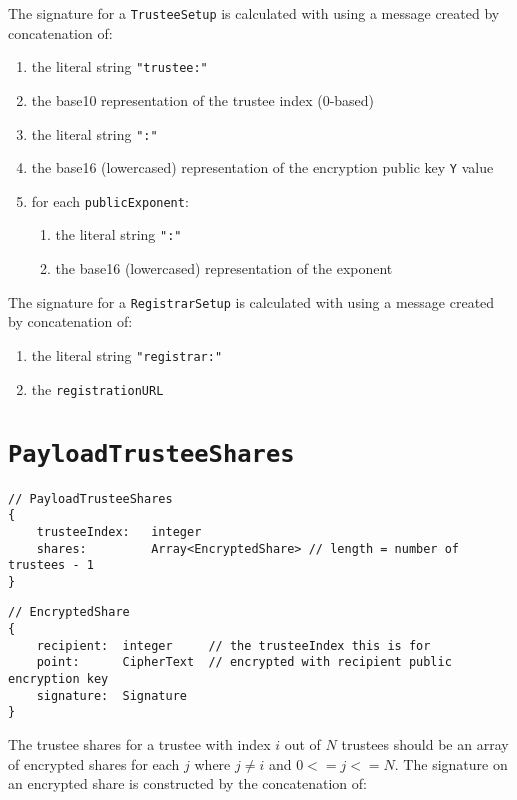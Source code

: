 The signature for a \texttt{TrusteeSetup} is calculated with using a message created by concatenation of:
\begin{enumerate}
  \item the literal string \lstinline[style=ES6]{"trustee:"}
  \item the base10 representation of the trustee index (0-based)
  \item the literal string \lstinline[style=ES6]{":"}
  \item the base16 (lowercased) representation of the encryption public key \texttt{Y} value
  \item for each \texttt{publicExponent}:
        \begin{enumerate}
          \item the literal string \lstinline[style=ES6]{":"}
          \item the base16 (lowercased) representation of the exponent
        \end{enumerate}
\end{enumerate}

The signature for a \texttt{RegistrarSetup} is calculated with using a message created by concatenation of:

\begin{enumerate}
  \item the literal string \lstinline[style=ES6]{"registrar:"}
  \item the \texttt{registrationURL}
\end{enumerate}


\section*{\texttt{PayloadTrusteeShares}}
\label{dt:payload:shares}
\begin{lstlisting}[style=ES6]
// PayloadTrusteeShares
{
    trusteeIndex:   integer
    shares:         Array<EncryptedShare> // length = number of trustees - 1
}
\end{lstlisting}
\vspace*{-0.95em}
\label{dt:encshare}
\begin{lstlisting}[style=ES6, firstnumber=last]
// EncryptedShare
{
    recipient:  integer     // the trusteeIndex this is for
    point:      CipherText  // encrypted with recipient public encryption key
    signature:  Signature
}
\end{lstlisting}

The trustee shares for a trustee with index $i$ out of $N$ trustees should be an array of encrypted shares for each $j$ where $j \neq i$ and $0 <= j <= N$. The signature on an encrypted share is constructed by the concatenation of:

